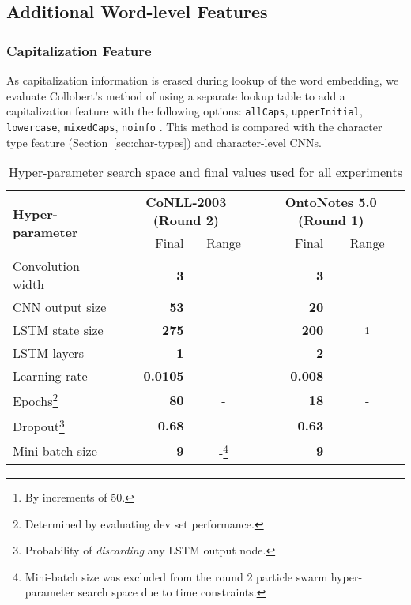 \documentclass[11pt,letterpaper]{article}
\begin{document}
\subsection{Additional Word-level Features}

\subsubsection{Capitalization Feature}
\label{sec:caps}
As capitalization information is erased during lookup of the word embedding, we evaluate Collobert's  method of using a separate lookup table to add a capitalization feature with the following options: {\tt allCaps}, {\tt upperInitial}, {\tt lowercase}, {\tt mixedCaps}, {\tt noinfo} \cite{collobert2011}. This method is compared with the character type feature (Section~\ref{sec:char-types}) and character-level CNNs.






\begin{savenotes}
\begin{table*}[t]
\begin{center}
\small
\begin{tabular}{|l|r|c|r|c|}
\hline \multirow{2}{*}{\bf Hyper-parameter} & \multicolumn{2}{c|}{\bf CoNLL-2003 (Round 2)} & \multicolumn{2}{c|}{\bf OntoNotes 5.0 (Round 1)} \\ \cline{2-5}
& Final & Range & Final & Range \\ \hline
Convolution width & \bf 3 &  & \bf 3 &  \\
CNN output size & \bf 53 &  & \bf 20 &  \\
LSTM state size & \bf 275 &  & \bf 200 & \footnote{By increments of 50.}\\
LSTM layers & \bf 1 &  & \bf 2 &  \\
Learning rate & \bf 0.0105 &  & \bf 0.008 &  \\
Epochs\footnote{Determined by evaluating dev set performance.} & \bf 80 & \-- & \bf 18 & \-- \\
Dropout\footnote{Probability of \emph{discarding} any LSTM output node.} & \bf 0.68 &  & \bf \bf 0.63 & \\
Mini-batch size & \bf 9 & \--\footnote{Mini-batch size was  excluded from the round 2 particle swarm hyper-parameter search space due to time constraints.} & \bf 9 &  \\
\hline
\end{tabular}
\end{center}
\caption{Hyper-parameter search space and final values used for all experiments}
\label{tab:hyperparams}
\end{table*}
\end{savenotes}
\end{document}
